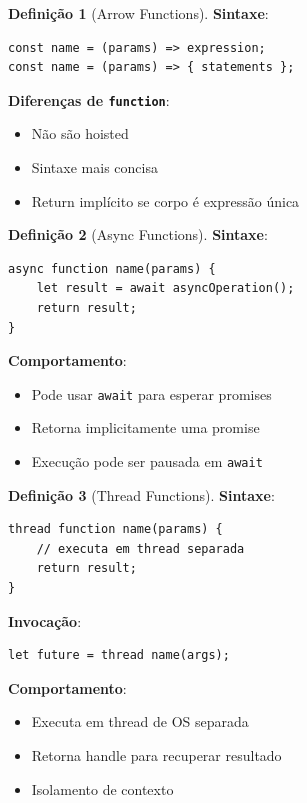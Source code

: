 \documentclass[12pt,a4paper]{article}
\theoremstyle{definition}
\newtheorem{definition}{Definição}[section]
\begin{document}
\begin{definition}[Arrow Functions]
\textbf{Sintaxe}:
\begin{verbatim}
const name = (params) => expression;
const name = (params) => { statements };
\end{verbatim}

\textbf{Diferenças de \texttt{function}}:
\begin{itemize}
    \item Não são hoisted
    \item Sintaxe mais concisa
    \item Return implícito se corpo é expressão única
\end{itemize}
\end{definition}

\begin{definition}[Async Functions]
\textbf{Sintaxe}:
\begin{verbatim}
async function name(params) {
    let result = await asyncOperation();
    return result;
}
\end{verbatim}

\textbf{Comportamento}:
\begin{itemize}
    \item Pode usar \texttt{await} para esperar promises
    \item Retorna implicitamente uma promise
    \item Execução pode ser pausada em \texttt{await}
\end{itemize}
\end{definition}

\begin{definition}[Thread Functions]
\textbf{Sintaxe}:
\begin{verbatim}
thread function name(params) {
    // executa em thread separada
    return result;
}
\end{verbatim}

\textbf{Invocação}:
\begin{verbatim}
let future = thread name(args);
\end{verbatim}

\textbf{Comportamento}:
\begin{itemize}
    \item Executa em thread de OS separada
    \item Retorna handle para recuperar resultado
    \item Isolamento de contexto
\end{itemize}
\end{definition}
\end{document}
